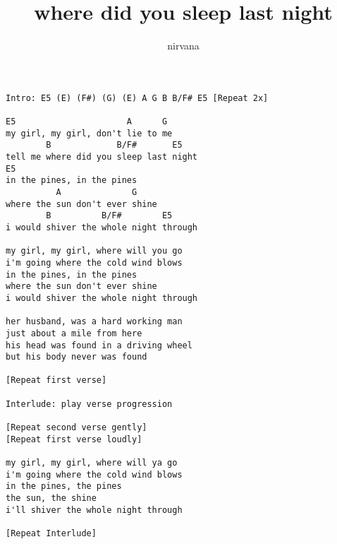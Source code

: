 \author{nirvana}
\title{where did you sleep last night}
\maketitle
\begin{verbatim}
Intro: E5 (E) (F#) (G) (E) A G B B/F# E5 [Repeat 2x]

E5                      A      G
my girl, my girl, don't lie to me
        B             B/F#       E5
tell me where did you sleep last night
E5
in the pines, in the pines
          A              G
where the sun don't ever shine
        B          B/F#        E5
i would shiver the whole night through

my girl, my girl, where will you go
i'm going where the cold wind blows
in the pines, in the pines
where the sun don't ever shine
i would shiver the whole night through

her husband, was a hard working man
just about a mile from here
his head was found in a driving wheel
but his body never was found

[Repeat first verse]

Interlude: play verse progression

[Repeat second verse gently]
[Repeat first verse loudly]

my girl, my girl, where will ya go
i'm going where the cold wind blows
in the pines, the pines
the sun, the shine
i'll shiver the whole night through

[Repeat Interlude]
\end{verbatim}
